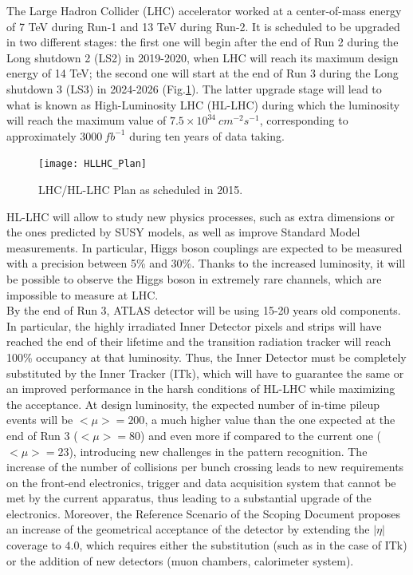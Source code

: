 \documentclass[a4paper,twoside,12pt]{article}
\begin{document}
The Large Hadron Collider (LHC) accelerator worked at a center-of-mass energy of 7 TeV during Run-1 and 13 TeV during Run-2. It is scheduled to be upgraded in two different stages: the first one will begin after the end of Run 2 during the Long shutdown 2 (LS2) in 2019-2020, when LHC will reach its maximum design energy of 14 TeV; the second one will start at the end of Run 3 during the Long shutdown 3 (LS3) in 2024-2026 (Fig.\ref{fig:HLLHC_Plan}). The latter upgrade stage will lead to what is known as High-Luminosity LHC (HL-LHC) during which the
luminosity will reach the maximum value of $7.5 \times 10^{34}\ cm^{-2}s^{-1}$, corresponding to approximately $3000\ fb^{-1}$ during ten years of data taking. \\

\begin{figure} [h]
	\texttt{[image: HLLHC\_Plan]}
	\caption{LHC/HL-LHC Plan as scheduled in 2015\cite{scoping}.}
	\label{fig:HLLHC_Plan}
\end{figure}

HL-LHC will allow to study new physics processes, such as extra dimensions or the ones predicted by SUSY models, as well as improve Standard Model measurements. In particular, Higgs boson 
couplings are expected to be measured with a precision between 5\% and 30\%\cite{loi}. Thanks to the increased luminosity, it will be possible to observe the Higgs boson in extremely
rare channels, which are impossible to measure at LHC.\\

By the end of Run 3, ATLAS detector will be using 15-20 years old components. In particular,
the highly irradiated Inner Detector pixels and strips will have reached the end of their
lifetime and the transition radiation tracker will reach 100\% occupancy at that luminosity. Thus, the Inner Detector must be completely substituted by the Inner Tracker (ITk), which will
have to guarantee the same or an improved performance in the harsh conditions of HL-LHC while maximizing the acceptance. At design luminosity, the expected number of in-time pileup events will be $<\mu > = 200$, a much
higher value than the one expected at the end of Run 3 ($<\mu > = 80$) and even more if 
compared to the current one ($<\mu > = 23$), introducing new challenges in the pattern
recognition. The increase of the number
of collisions per bunch crossing leads to new requirements on the front-end electronics, trigger and data acquisition system that cannot be met by the current apparatus, thus leading to a 
substantial upgrade of the electronics. Moreover, the Reference Scenario of the Scoping Document\cite{scoping} proposes an increase of the geometrical acceptance of the detector by extending the $|\eta|$ coverage to $4.0$, which requires either the substitution (such as in the case of ITk) or the addition of new detectors (muon chambers,
calorimeter system). \\
\end{document}
